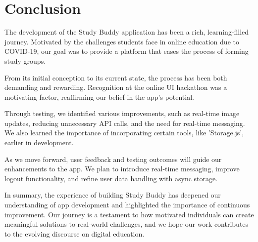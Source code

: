 \chapter{Conclusion}
\label{ch:sum}

The development of the Study Buddy application has been a rich, learning-filled journey. Motivated by the challenges students face in online education due to COVID-19, our goal was to provide a platform that eases the process of forming study groups.

From its initial conception to its current state, the process has been both demanding and rewarding. Recognition at the online UI hackathon was a motivating factor, reaffirming our belief in the app's potential.

Through testing, we identified various improvements, such as real-time image updates, reducing unnecessary API calls, and the need for real-time messaging. We also learned the importance of incorporating certain tools, like 'Storage.js', earlier in development.

As we move forward, user feedback and testing outcomes will guide our enhancements to the app. We plan to introduce real-time messaging, improve logout functionality, and refine user data handling with async storage.

In summary, the experience of building Study Buddy has deepened our understanding of app development and highlighted the importance of continuous improvement. Our journey is a testament to how motivated individuals can create meaningful solutions to real-world challenges, and we hope our work contributes to the evolving discourse on digital education.

